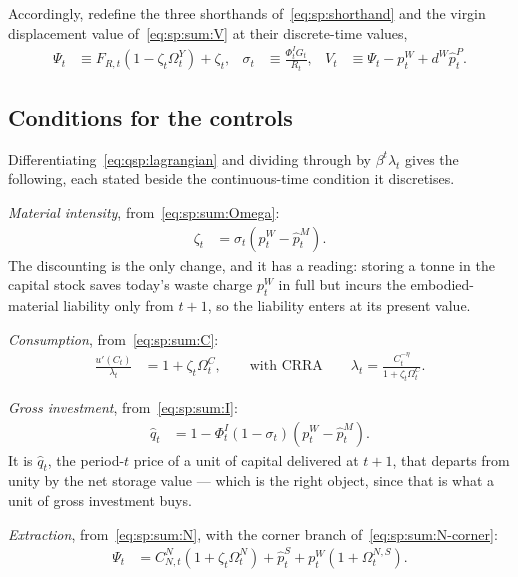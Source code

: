Accordingly, redefine the three shorthands of~\eqref{eq:sp:shorthand} and the virgin displacement value
of~\eqref{eq:sp:sum:V} at their discrete-time values,
\begin{align}
\Psi_t &\equiv F_{R,t}\left(1-\zeta_t\Omega^Y_t\right)+\zeta_t,
&
\sigma_t &\equiv \frac{\Phi^I_tG_t}{R_t},
&
V_t &\equiv \Psi_t-p^W_t+d^W\hat p^P_t .
\label{eq:qsp:shorthand}
\end{align}

\subsection{Conditions for the controls}\label{sec:qsp:model:controls}

Differentiating~\eqref{eq:qsp:lagrangian} and dividing through by $\beta^t\lambda_t$ gives the
following, each stated beside the continuous-time condition it discretises.

\emph{Material intensity}, from~\eqref{eq:sp:sum:Omega}:
\begin{align}
\zeta_t &= \sigma_t\left(p^W_t-\hat p^M_t\right).
\label{eq:qsp:foc:Omega}
\end{align}
The discounting is the only change, and it has a reading: storing a tonne in the capital stock saves
today's waste charge $p^W_t$ in full but incurs the embodied-material liability only from $t+1$, so the
liability enters at its present value.

\emph{Consumption}, from~\eqref{eq:sp:sum:C}:
\begin{align}
\frac{u'\!\left(C_t\right)}{\lambda_t} &= 1+\zeta_t\Omega^C_t ,
\qquad\text{with CRRA}\qquad
\lambda_t = \frac{C_t^{-\eta}}{1+\zeta_t\Omega^C_t}.
\label{eq:qsp:foc:C}
\end{align}

\emph{Gross investment}, from~\eqref{eq:sp:sum:I}:
\begin{align}
\hat q_t &= 1-\Phi^I_t\left(1-\sigma_t\right)\left(p^W_t-\hat p^M_t\right).
\label{eq:qsp:foc:G}
\end{align}
It is $\hat q_t$, the period-$t$ price of a unit of capital delivered at $t+1$, that departs from unity
by the net storage value --- which is the right object, since that is what a unit of gross investment
buys.

\emph{Extraction}, from~\eqref{eq:sp:sum:N}, with the corner branch of~\eqref{eq:sp:sum:N-corner}:
\begin{align}
\Psi_t &= C^N_{N\!,t}\left(1+\zeta_t\Omega^N_t\right)+\hat p^S_t+p^W_t\left(1+\Omega^{N,S}_t\right).
\label{eq:qsp:foc:N}
\end{align}

